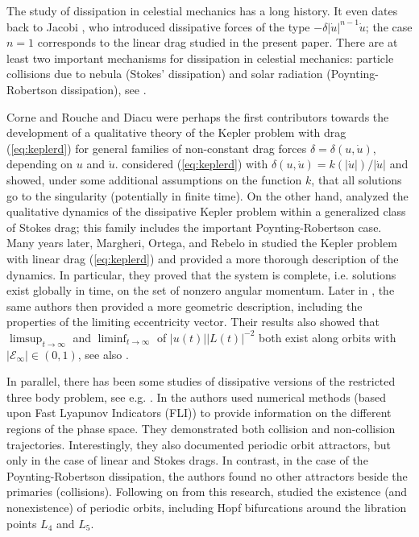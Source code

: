 \documentclass[reqno,12pt]{amsart}
\newcommand{\eqlab}[1]{\label{eq:#1}}
\renewcommand{\eqref}[1]{(\ref{eq:#1})}
\numberwithin{equation}{section}
\begin{document}
The study of dissipation in celestial mechanics has a long history. It even dates back to Jacobi \cite{clebsch2009a}, who introduced dissipative forces of the type $-\delta \vert \dot u\vert^{n-1}\dot  u$; the case $n=1$ corresponds to the linear drag studied in the present paper. There are at least two important mechanisms  for dissipation in celestial mechanics: particle collisions due to nebula (Stokes' dissipation) and solar radiation (Poynting-Robertson dissipation), see \cite{celletti2011a,margheri2014a}.

Corne and Rouche \cite{corne1973a} and  Diacu \cite{diacu1999a} were perhaps the first contributors towards the development of a qualitative theory of the Kepler problem with drag \eqref{keplerd}
for general families of non-constant drag forces $\delta=\delta(u,\dot u)$, depending on $u$ and $\dot u$. \cite{corne1973a} considered \eqref{keplerd} with $\delta (u,\dot u) = k(\vert \dot u\vert)/\vert \dot u\vert$ and showed, under some additional assumptions on the function $k$, that all solutions go to the singularity (potentially in finite time). On the other hand, \cite{diacu1999a} analyzed the qualitative dynamics of the dissipative Kepler problem within a generalized class of Stokes drag; this family includes the important Poynting-Robertson case. 
Many years later, Margheri, Ortega, and Rebelo in \cite{margheri2014a} studied the Kepler problem with linear drag \eqref{keplerd} and provided a more thorough description of the dynamics. In particular, they proved that the system is complete, i.e. solutions exist globally in time, on the set of nonzero angular momentum. Later in \cite{margheri2017a}, the same authors then provided a more geometric description, including the properties of the limiting eccentricity vector. Their results also showed that $\limsup_{t\rightarrow \infty}$ and $\liminf_{t\rightarrow\infty}$ of $\vert u(t)\vert\vert L(t)\vert^{-2}$ both exist along orbits with $\vert \mathcal E_\infty \vert \in (0,1)$,
see also \cite{haraux2021a}. 

In parallel, there has been some studies of dissipative versions of the restricted three body problem, see e.g. \cite{celletti2011a,hadjidemetriou2010a,margheri2012a}. In \cite{celletti2011a} the authors used numerical methods (based upon Fast Lyapunov Indicators (FLI))
to provide information on the different regions of the phase space. They demonstrated both collision and non-collision trajectories. Interestingly, they also documented periodic orbit attractors, but only in the case of linear and Stokes drags. In contrast, in the case of the Poynting-Robertson dissipation, the authors found no other attractors beside the primaries (collisions). 
Following on from this research, \cite{margheri2012a} studied the existence (and nonexistence) of periodic orbits, including Hopf bifurcations around the libration points $L_4$ and $L_5$. 
\end{document}
